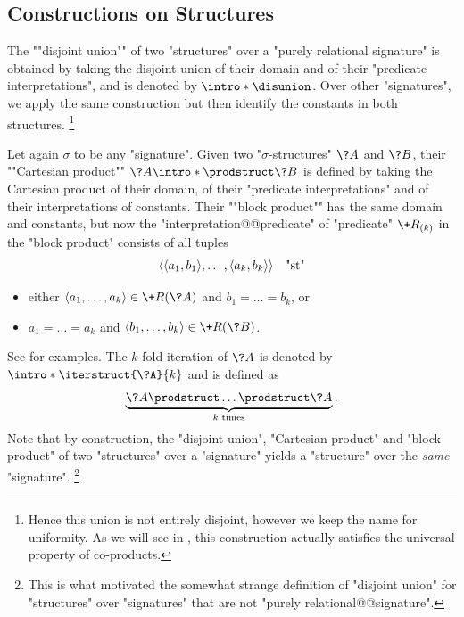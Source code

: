 \subsection{Constructions on Structures}

The \AP""disjoint union"" of two "structures" over a
"purely relational signature" 
is obtained by taking the disjoint union of their domain and of
their "predicate interpretations", and is denoted by \AP$\intro*\disunion$.
Over other "signatures", we apply the same construction but then identify the constants
in both structures.%
\footnote{Hence this union is not entirely disjoint, however we keep the name
for uniformity. As we will see in , this construction
actually satisfies the universal property of co-products.}

\begin{marginfigure}
	\centering
	\begin{tikzpicture}
		
	\end{tikzpicture}
	\caption{
		\AP\label{fig:general-prelim-product-Cartesian}
		Two "graphs@@dir" (above and left) and their "Cartesian product" (below right).
	}
\end{marginfigure}
\begin{marginfigure}
	\centering
	\begin{tikzpicture}
		
	\end{tikzpicture}
	\caption{
		\AP\label{fig:general-prelim-product-block}
		Two "graphs@@dir" (above and left) and their "block product" (below right).
	}
\end{marginfigure}
Let again $\sigma$ to be any "signature".
Given two "$\sigma$-structures" $\?A$ and $\?B$, their
""Cartesian product"" \AP$\?A \intro*\prodstruct \?B$
is defined by taking the Cartesian product of their domain, of
their "predicate interpretations" and of their interpretations of constants. 
Their ""block product"" has the same domain and constants,
but now the "interpretation@@predicate" of "predicate" $\+R_{(k)}$
in the "block product" consists of all tuples
\[\langle\langle a_1,b_1\rangle, \dotsc, \langle a_k,b_k\rangle\rangle \quad\text{"st"}\] 
\begin{itemize}
	\item either $\tup{a_1, \dotsc, a_k} \in \+R(\?A)$ and $b_1 = \dotsc = b_k$, or
	\item $a_1 = \dotsc = a_k$ and $\tup{b_1, \dotsc, b_k} \in \+R(\?B)$.
\end{itemize} 
See  for examples.
The $k$-fold iteration of $\?A$ is denoted by
$\intro*\iterstruct{\?A}{k}$ and is defined as
\[
	\underbrace{\?A \prodstruct \dotsc \prodstruct \?A}_{k \text{ times}}.
\]
Note that by construction, the "disjoint union", "Cartesian product" and "block product"
of two "structures" over a "signature" yields a "structure" over the \emph{same} "signature".%
\footnote{This is what motivated the somewhat strange definition
of "disjoint union" for "structures" over "signatures" that are not "purely relational@@signature".}

